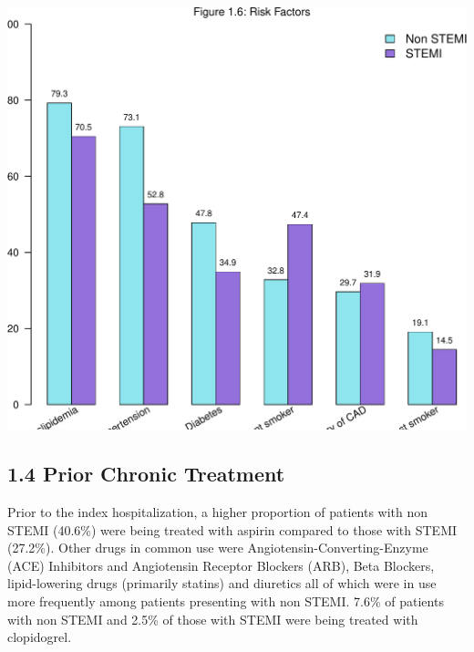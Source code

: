 \documentclass[
]{article}
\begin{document}
\includegraphics{ACSIS_2024_v1_pdf_files/figure-latex/unnamed-chunk-22-1.pdf}

\pagebreak

\subsection{1.4 Prior Chronic Treatment}\label{prior-chronic-treatment}

Prior to the index hospitalization, a higher proportion of patients with
non STEMI (40.6\%) were being treated with aspirin compared to those
with STEMI (27.2\%). Other drugs in common use were
Angiotensin-Converting-Enzyme (ACE) Inhibitors and Angiotensin Receptor
Blockers (ARB), Beta Blockers, lipid-lowering drugs (primarily statins)
and diuretics all of which were in use more frequently among patients
presenting with non STEMI. 7.6\% of patients with non STEMI and 2.5\% of
those with STEMI were being treated with clopidogrel.

~
\end{document}
